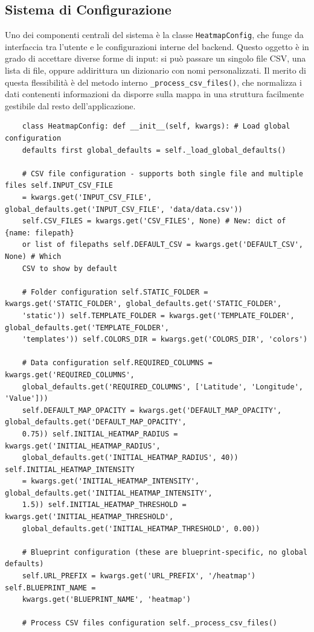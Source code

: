 \subsection{Sistema di Configurazione}

Uno dei componenti centrali del sistema è la classe \texttt{HeatmapConfig}, che funge
da interfaccia tra l'utente e le configurazioni interne del backend. Questo
oggetto è in grado di accettare diverse forme di input: si può passare un singolo
file CSV, una lista di file, oppure addirittura un dizionario con nomi personalizzati.
Il merito di questa flessibilità è del metodo interno \texttt{\_process\_csv\_files()},
che normalizza i dati contenenti informazioni da disporre sulla mappa in una
struttura facilmente gestibile dal resto dell'applicazione.

\begin{listing}
  [H]
  \caption{Costruttore della classe \texttt{HeatmapConfig}}
  \label{lst:heatmap_config}
  \begin{verbatim}
    class HeatmapConfig: def __init__(self, kwargs): # Load global configuration
    defaults first global_defaults = self._load_global_defaults()

    # CSV file configuration - supports both single file and multiple files self.INPUT_CSV_FILE
    = kwargs.get('INPUT_CSV_FILE', global_defaults.get('INPUT_CSV_FILE', 'data/data.csv'))
    self.CSV_FILES = kwargs.get('CSV_FILES', None) # New: dict of {name: filepath}
    or list of filepaths self.DEFAULT_CSV = kwargs.get('DEFAULT_CSV', None) # Which
    CSV to show by default

    # Folder configuration self.STATIC_FOLDER = kwargs.get('STATIC_FOLDER', global_defaults.get('STATIC_FOLDER',
    'static')) self.TEMPLATE_FOLDER = kwargs.get('TEMPLATE_FOLDER', global_defaults.get('TEMPLATE_FOLDER',
    'templates')) self.COLORS_DIR = kwargs.get('COLORS_DIR', 'colors')

    # Data configuration self.REQUIRED_COLUMNS = kwargs.get('REQUIRED_COLUMNS',
    global_defaults.get('REQUIRED_COLUMNS', ['Latitude', 'Longitude', 'Value']))
    self.DEFAULT_MAP_OPACITY = kwargs.get('DEFAULT_MAP_OPACITY', global_defaults.get('DEFAULT_MAP_OPACITY',
    0.75)) self.INITIAL_HEATMAP_RADIUS = kwargs.get('INITIAL_HEATMAP_RADIUS',
    global_defaults.get('INITIAL_HEATMAP_RADIUS', 40)) self.INITIAL_HEATMAP_INTENSITY
    = kwargs.get('INITIAL_HEATMAP_INTENSITY', global_defaults.get('INITIAL_HEATMAP_INTENSITY',
    1.5)) self.INITIAL_HEATMAP_THRESHOLD = kwargs.get('INITIAL_HEATMAP_THRESHOLD',
    global_defaults.get('INITIAL_HEATMAP_THRESHOLD', 0.00))

    # Blueprint configuration (these are blueprint-specific, no global defaults)
    self.URL_PREFIX = kwargs.get('URL_PREFIX', '/heatmap') self.BLUEPRINT_NAME =
    kwargs.get('BLUEPRINT_NAME', 'heatmap')

    # Process CSV files configuration self._process_csv_files()
  \end{verbatim}
\end{listing}

